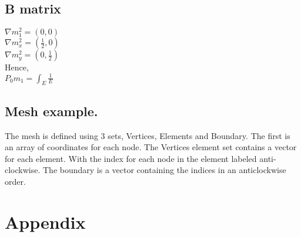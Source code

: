 \documentclass{article}
\begin{document}
\subsection{B matrix}
$\nabla m_1^2 = (0,0)$\\
$\nabla m_x^2 = (\frac{1}{2},0)$ \\
$\nabla m_y^2 = (0,\frac{1}{2})$ \\

Hence, \\
$P_0m_1 = \int_E\frac{1}{E}$

\subsection{Mesh example.}
The mesh is defined using 3 sets, Vertices, Elements and Boundary. The first is an array of coordinates for each node. The Vertices element set contains a vector for each element. With the index for each node in the element labeled anti-clockwise. The boundary is a vector containing the indices in an anticlockwise order.




%

\section{Appendix}
%
\end{document}
